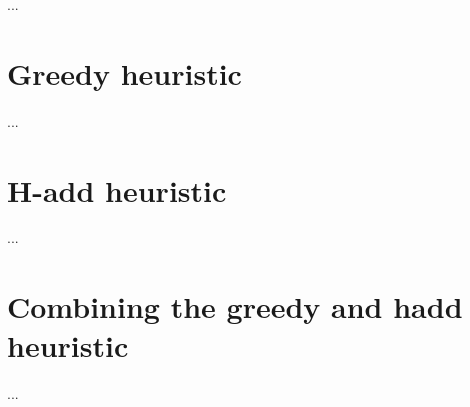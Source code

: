 ...

\section{Greedy heuristic}
...

\section{H-add heuristic}
...

\section{Combining the greedy and hadd heuristic}
...
